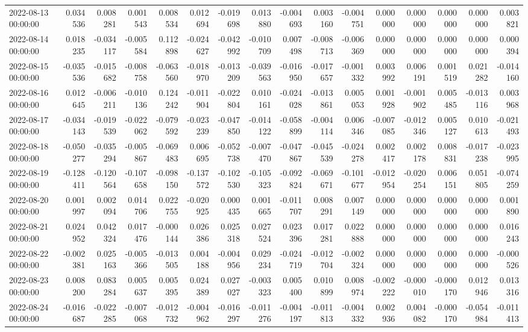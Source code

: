\begin{tabular}{lrrrrrrrrrrrrrrr}
2022-08-13 00:00:00 & 0.034536 & 0.008281 & 0.001543 & 0.008534 & 0.012694 & -0.019698 & 0.013880 & -0.004693 & 0.003160 & -0.004751 & 0.000000 & 0.000000 & 0.000000 & 0.000000 & 0.003821 \\
2022-08-14 00:00:00 & 0.018235 & -0.034117 & -0.005584 & 0.112898 & -0.024627 & -0.042992 & -0.010709 & 0.007498 & -0.008713 & -0.006369 & 0.000000 & 0.000000 & 0.000000 & 0.000000 & 0.000394 \\
2022-08-15 00:00:00 & -0.035536 & -0.015682 & -0.008758 & -0.063560 & -0.018970 & -0.013209 & -0.039563 & -0.016950 & -0.017657 & -0.001332 & 0.003992 & 0.006191 & 0.001519 & 0.021282 & -0.014160 \\
2022-08-16 00:00:00 & 0.012645 & -0.006211 & -0.010136 & 0.124242 & -0.011904 & -0.022804 & 0.010161 & -0.024028 & -0.013861 & 0.005053 & 0.001928 & -0.001902 & 0.005485 & -0.013116 & 0.003968 \\
2022-08-17 00:00:00 & -0.034143 & -0.019539 & -0.022062 & -0.079592 & -0.023239 & -0.047850 & -0.014122 & -0.058899 & -0.004114 & 0.006346 & -0.007085 & -0.012346 & 0.005127 & 0.010613 & -0.021493 \\
2022-08-18 00:00:00 & -0.050277 & -0.035294 & -0.005867 & -0.069483 & 0.006695 & -0.052738 & -0.007470 & -0.047867 & -0.045539 & -0.024278 & 0.002417 & 0.002178 & 0.008831 & -0.017238 & -0.023995 \\
2022-08-19 00:00:00 & -0.128411 & -0.120564 & -0.107658 & -0.098150 & -0.137572 & -0.102530 & -0.105323 & -0.092824 & -0.069671 & -0.101677 & -0.012954 & -0.020254 & 0.006151 & 0.051805 & -0.074259 \\
2022-08-20 00:00:00 & 0.001997 & 0.002094 & 0.014706 & 0.022755 & -0.020925 & 0.000435 & 0.001665 & -0.011707 & 0.008291 & 0.007149 & 0.000000 & 0.000000 & 0.000000 & 0.000000 & 0.001890 \\
2022-08-21 00:00:00 & 0.024952 & 0.042324 & 0.017476 & -0.000144 & 0.026386 & 0.025318 & 0.027524 & 0.023396 & 0.017281 & 0.022888 & 0.000000 & 0.000000 & 0.000000 & 0.000000 & 0.016243 \\
2022-08-22 00:00:00 & -0.002381 & 0.025163 & -0.005366 & -0.013505 & 0.004188 & -0.004956 & 0.029234 & -0.024719 & -0.012704 & -0.002324 & 0.000000 & 0.000000 & 0.000000 & 0.000000 & -0.000526 \\
2022-08-23 00:00:00 & 0.008200 & 0.083284 & 0.005637 & 0.005395 & 0.024389 & 0.027027 & -0.003323 & 0.005400 & 0.010899 & 0.008974 & -0.002222 & -0.000010 & -0.000170 & 0.012946 & 0.013316 \\
2022-08-24 00:00:00 & -0.016687 & -0.022285 & -0.007068 & -0.012732 & -0.004962 & -0.016297 & -0.011276 & -0.004197 & -0.011813 & -0.004332 & 0.002936 & 0.004082 & -0.000170 & -0.054984 & -0.011413 \\

\end{tabular}
